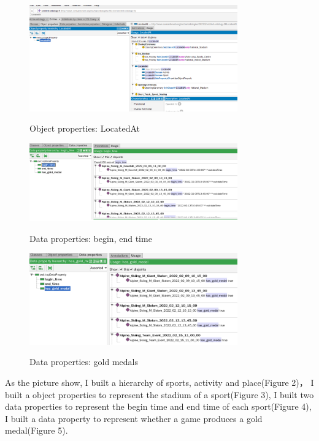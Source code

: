 \documentclass[12pt]{article}
\begin{document}
        \begin{figure}[h]
            \centering
            \includegraphics[width=0.8\textwidth]{14_3.png}\\
            \caption{Object properties: LocatedAt}
            \label{fig:roc}
            \end{figure}
            \begin{figure}[h]
                \centering
                \includegraphics[width=0.8\textwidth]{14_4.png}\\
                \caption{ Data properties: begin, end time}
                \label{fig:roc}
                \end{figure}
                \begin{figure}[h]
                    \centering
                    \includegraphics[width=0.8\textwidth]{14_5.png}\\
                    \caption{ Data properties: gold medals}
                    \label{fig:roc}
                    \end{figure}
        As the picture show, I built a hierarchy of sports, activity and place(Figure 2)， 
        I built a object properties to represent the stadium of a sport(Figure 3), I built two
        data properties to represent the begin time and end time of each sport(Figure 4), I built a
        data property to represent whether a game produces a gold medal(Figure 5).
\end{document}
